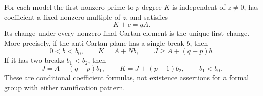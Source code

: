 \begin{lemma}
\label{lem:B-RD59-anti-patterns}
For each model the first nonzero prime-to-$p$ degree $K$ is
independent of $z\ne0$, has coefficient a fixed nonzero multiple
of $z$, and satisfies
\[
                           K+c=qA.                     \tag{B-RD59.2}
\]
Its change under every nonzero final Cartan element is the unique
first change. More precisely, if the anti-Cartan plane has a single
break $b$, then
\[
            0<b<b_0,\qquad K=A+Nb,\qquad
                           J\ge A+(q-p)b.              \tag{B-RD59.3}
\]
If it has two breaks $b_1<b_2$, then
\[
       J=A+(q-p)b_1,\qquad
       K=J+(p-1)b_2,\qquad b_1<b_0.                    \tag{B-RD59.4}
\]
These are conditional coefficient formulas, not existence assertions
for a formal group with either ramification pattern.
\end{lemma}
